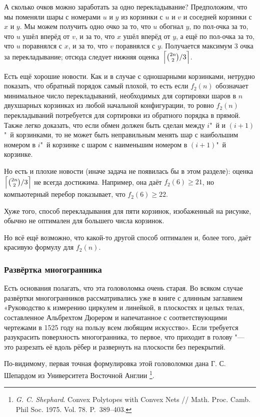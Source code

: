 \documentclass[twoside]{book}
\begin{document}
А сколько очков можно заработать за одно перекладывание?
Предположим, что мы поменяли шары с номерами $u$ и $y$ из корзинки с $u$ и $v$ и соседней корзинки с $x$ и $y$.
Мы можем получить одно очко за то, что $u$ обогнал $y$,
по пол-очка за то, что $u$ ушёл вперёд от $v$,
и за то, что $x$ ушёл вперёд от $y$,
а ещё по пол-очка за то, что $u$ поравнялся с $x$, 
и за то, что $v$ поравнялся с $y$.
Получается максимум 3 очка за перекладывание;
отсюда следует нижняя оценка~$\Bigl\lceil\binom{2n}{2}/3\Bigr\rceil$.


Есть ещё хорошие новости.
Как и в случае с одношарными корзинками,
нетрудно показать, что обратный порядок самый плохой, то есть если
$f_2(n)$ обозначает минимальное число перекладываний, необходимых для
сортировки шаров в $n$ двухшарных корзинках из любой начальной
конфигурации, то ровно $f_2(n)$ перекладываний потребуется для
сортировки из обратного порядка в прямой.
Также легко доказать, что если обмен
должен быть сделан между $i$"~й и $(i+1)$"~й корзинками, то не может
быть неправильным менять шар с наибольшим номером в $i$"~й корзинке с
шаром с наименьшим номером в $(i+1)$"~й корзинке.

Но есть и плохие новости (иначе задача не появилась бы в этом разделе):
оценка $\Bigl\lceil\binom{2n}{2}/3\Bigr\rceil$ не всегда достижима.
Например, она даёт $f_2(6)\ge 21$, но компьютерный перебор показывает,
что $f_2(6)\geqslant 22$.

Хуже того, способ перекладывания для пяти корзинок, изобаженный на
рисунке, обычно не оптимален для большего числа корзинок.

Но всё ещё возможно, что какой-то другой способ оптимален и, более
того, даёт красивую формулу для $f_2(n)$.

\subsubsection*{Развёртка многогранника}

Есть основания полагать, что эта головоломка очень старая.
Во всяком
случае развёртки многогранников рассматривались уже в книге с длинным
заглавием «Руководство к измерению циркулем и линейкой, в плоскостях и целых телах, составленное Альбрехтом Дюрером и напечатанное с соответствующими чертежами в 1525 году на пользу всем любящим искусство».
Если требуется разукрасить поверхность многогранника,
то первое, что приходит в голову "--- это разрезать её вдоль рёбер и
развернуть на плоскости без перекрытий.

По-видимому, первая точная формулировка этой головоломки дана Г. С. Шепардом из Университета Восточной Англии%
\footnote{\emph{G. C. Shephard}. Convex Polytopes with Convex Nets /\!/ {Math. Proc. Camb. Phil Soc.} 1975. Vol. 78. P.~389--403.}.
\end{document}

